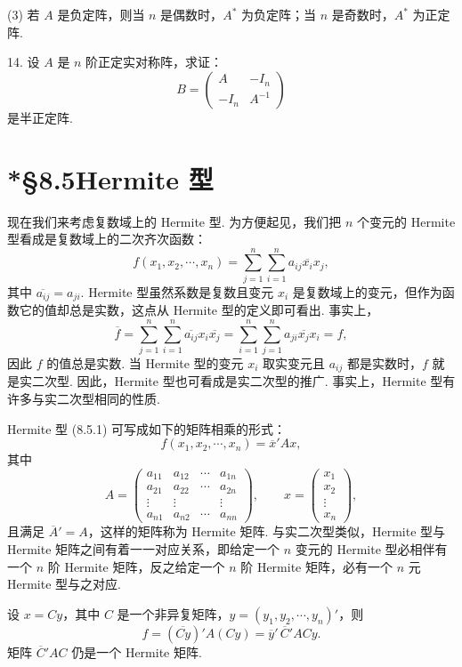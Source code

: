 \documentclass[UTF8,12pt,a4paper,fontset=fandol]{ctexart}
\begin{document}
(3) 若 $A$ 是负定阵，则当 $n$ 是偶数时，$A^*$ 为负定阵；当 $n$ 是奇数时，$A^*$ 为正定阵.

14. 设 $A$ 是 $n$ 阶正定实对称阵，求证：
\[
B=\left(\begin{array}{cc}A&-I_n\\ -I_n&A^{-1}\end{array}\right)
\]
是半正定阵.

\section*{*§8.5\quad Hermite 型}

现在我们来考虑复数域上的 Hermite 型. 为方便起见，我们把 $n$ 个变元的 Hermite 型看成是复数域上的二次齐次函数：
\begin{equation}
f(x_1,x_2,\cdots,x_n)=\sum_{j=1}^n\sum_{i=1}^n a_{ij}\overline{x_i}x_j,
\tag{8.5.1}
\end{equation}
其中 $\overline{a_{ij}}=a_{ji}$. Hermite 型虽然系数是复数且变元 $x_i$ 是复数域上的变元，但作为函数它的值却总是实数，这点从 Hermite 型的定义即可看出. 事实上，
\[
\overline{f}=\sum_{j=1}^n\sum_{i=1}^n \overline{a_{ij}}x_i\overline{x_j}
=\sum_{i=1}^n\sum_{j=1}^n a_{ji}\overline{x_j}x_i=f,
\]
因此 $f$ 的值总是实数. 当 Hermite 型的变元 $x_i$ 取实变元且 $a_{ij}$ 都是实数时，$f$ 就是实二次型. 因此，Hermite 型也可看成是实二次型的推广. 事实上，Hermite 型有许多与实二次型相同的性质.

Hermite 型 (8.5.1) 可写成如下的矩阵相乘的形式：
\[
f(x_1,x_2,\cdots,x_n)=\overline{x}'Ax,
\]
其中
\[
A=\left(\begin{array}{cccc}
a_{11}&a_{12}&\cdots&a_{1n}\\
a_{21}&a_{22}&\cdots&a_{2n}\\
\vdots&\vdots&&\vdots\\
a_{n1}&a_{n2}&\cdots&a_{nn}
\end{array}\right),\qquad
x=\left(\begin{array}{c}x_1\\x_2\\ \vdots\\x_n\end{array}\right),
\]
且满足 $\overline{A}'=A$，这样的矩阵称为 Hermite 矩阵. 与实二次型类似，Hermite 型与 Hermite 矩阵之间有着一一对应关系，即给定一个 $n$ 变元的 Hermite 型必相伴有一个 $n$ 阶 Hermite 矩阵，反之给定一个 $n$ 阶 Hermite 矩阵，必有一个 $n$ 元 Hermite 型与之对应.

设 $x=Cy$，其中 $C$ 是一个非异复矩阵，$y=(y_1,y_2,\cdots,y_n)'$，则
\[
f=(\overline{Cy})'A(Cy)=\overline{y}'\,\overline{C}'ACy.
\]
矩阵 $\overline{C}'AC$ 仍是一个 Hermite 矩阵.
\end{document}
